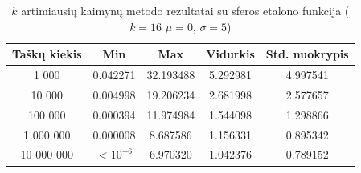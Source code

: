 \begin{table}[H]
    \centering
    \begin{tabular}{|c|c|c|c|c|}
        \hline
        \textbf{Taškų kiekis} & \textbf{Min} & \textbf{Max} & \textbf{Vidurkis} & \textbf{Std. nuokrypis} \\ \hline
        1 000        & 0.042271 & 32.193488 & 5.292981 & 4.997541 \\ \hline
        10 000       & 0.004998 & 19.206234 & 2.681998 & 2.577657 \\ \hline
        100 000      & 0.000394 & 11.974984 & 1.544098 & 1.298866 \\ \hline
        1 000 000    & 0.000008 & 8.687586 & 1.156331 & 0.895342 \\ \hline
        10 000 000   & $<10^{-6}$ & 6.970320 & 1.042376 & 0.789152 \\ \hline
    \end{tabular}
    \caption{$k$ artimiausių kaimynų metodo rezultatai su sferos etalono funkcija ($k = 16$ $\mu = 0$, $\sigma = 5$)}
\end{table}